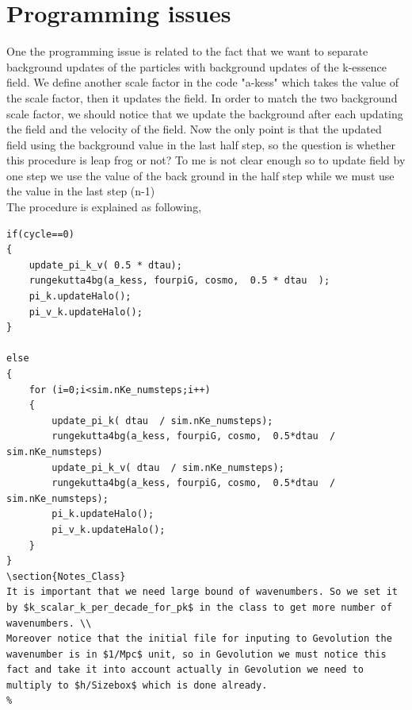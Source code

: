 \documentclass[a4paper,14pt]{article}
\newcommand {\be}{\begin{equation}}
\newcommand {\ee}{\end{equation}}
\begin{document}
\section{Programming issues}
One the programming issue is related to the fact that we want to separate background updates of the particles with background updates of the k-essence field. We define another scale factor in the code "a-kess" which takes the value of the scale factor, then it updates the field. In order to match the two background scale factor, we should notice that we update the background after each updating the field and the velocity of the field. Now the only point is that the updated field using the background value in the last half step, so the question is whether this procedure is leap frog or not? {\color{red} To me is not clear enough so to update field by one step we use the value of the back ground in the half step while we must use the value in the last step (n-1)}  \\
The procedure is explained as following,
\begin{lstlisting}
if(cycle==0)
{
	update_pi_k_v( 0.5 * dtau);
	rungekutta4bg(a_kess, fourpiG, cosmo,  0.5 * dtau  );
	pi_k.updateHalo();
	pi_v_k.updateHalo();
}

else
{
	for (i=0;i<sim.nKe_numsteps;i++)
	{
		update_pi_k( dtau  / sim.nKe_numsteps);
		rungekutta4bg(a_kess, fourpiG, cosmo,  0.5*dtau  / sim.nKe_numsteps)
		update_pi_k_v( dtau  / sim.nKe_numsteps);
		rungekutta4bg(a_kess, fourpiG, cosmo,  0.5*dtau  / sim.nKe_numsteps);
		pi_k.updateHalo();
		pi_v_k.updateHalo();
	}
}
\section{Notes_Class}
It is important that we need large bound of wavenumbers. So we set it by $k_scalar_k_per_decade_for_pk$ in the class to get more number of wavenumbers. \\
Moreover notice that the initial file for inputing to Gevolution the wavenumber is in $1/Mpc$ unit, so in Gevolution we must notice this fact and take it into account actually in Gevolution we need to multiply to $h/Sizebox$ which is done already.
%
\end{lstlisting}
\end{document}

